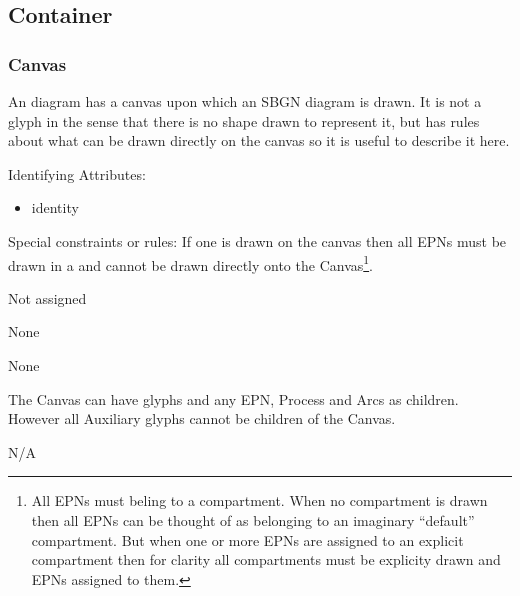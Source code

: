 
\subsection{Container}

\subsubsection{Canvas}

An \PD diagram has a canvas upon which an SBGN diagram is drawn. It is
not a glyph in the sense that there is no shape drawn to represent it,
but \SBGNPDLone has rules about what can be drawn directly on the canvas so
it is useful to describe it here.

\begin{glyphDescription}
\item[Identifying Attributes:]\mbox{}
  \begin{itemize}
  \item identity
 \end{itemize}
\item[Special constraints or rules:]\mbox{}\newline If one
   is drawn on the canvas then all EPNs must be
  drawn in a  and cannot be drawn directly onto the
  Canvas\footnote{All EPNs must beling to a compartment. When no compartment is drawn then all EPNs can be
    thought of as belonging to an imaginary ``default''
    compartment. But when one or more EPNs are assigned to an explicit
  compartment then for clarity all compartments must be explicity
  drawn and EPNs assigned to them.}.

\glyphSboTerm Not assigned

\glyphContainer None

\glyphLabel None

\glyphAux The Canvas can have  glyphs and any EPN,
Process and Arcs as children. However all Auxiliary glyphs cannot be
children of the Canvas.
 
\glyphCloning N/A

\end{glyphDescription}

